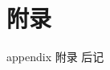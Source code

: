 \documentclass[degree=undergraduate,bibstyle=numerical,font=empty]{xmuthesis}
\begin{document}
\maketitle


\xmutableofcontents %




\nocite{*} 

\appendix
\chapter{附录}{appendix}
附录
\backmatter
后记
\end{document}
